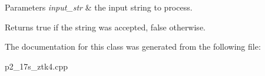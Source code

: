 \begin{DoxyParams}{Parameters}
{\em input\+\_\+str} & the input string to process.\\
\hline
\end{DoxyParams}
\begin{DoxyReturn}{Returns}
true if the string was accepted, false otherwise. 
\end{DoxyReturn}


The documentation for this class was generated from the following file\+:\begin{DoxyCompactItemize}
\item 
p2\+\_\+17s\+\_\+ztk4.\+cpp\end{DoxyCompactItemize}
